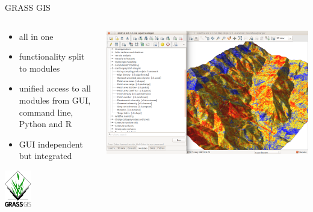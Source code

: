 \documentclass[xcolor={dvipsnames,usenames},beamer,aspectratio=169]{beamer}
\begin{document}
\begin{frame}{GRASS GIS}

\begin{columns}
\begin{column}{0.4\textwidth}

 \begin{itemize}
  \item all in one
  \item functionality split to modules
  \item unified access to all modules from GUI, command line, Python and R
  \item GUI independent but integrated
\end{itemize}

\begin{center}
\includegraphics[width=0.3\textwidth]{logos/grass_gis}
\end{center}

\end{column}
\begin{column}{0.55\textwidth}

\begin{center}
  \includegraphics[width=\textwidth]{grass/count_and_modules}
\end{center}

\end{column}
\end{columns}

\end{frame}
\end{document}
